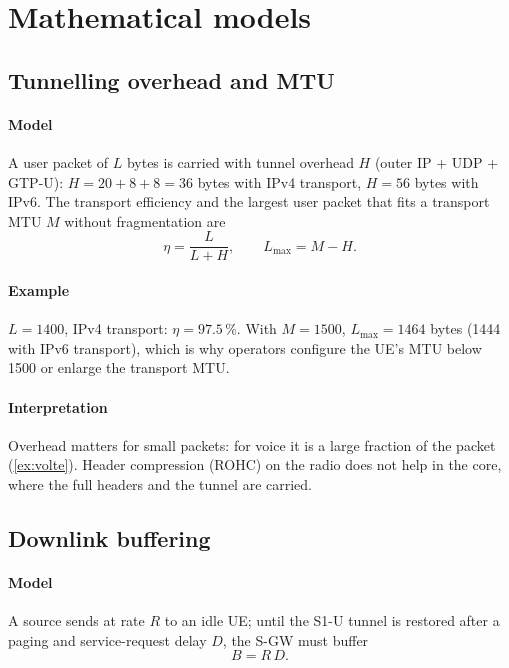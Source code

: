 \documentclass[11pt,a4paper]{article}
\begin{document}
\section{Mathematical models}

\subsection{Tunnelling overhead and MTU}\label{sec:gtp}
\paragraph{Model} A user packet of $L$ bytes is carried with tunnel overhead $H$ (outer IP + UDP + GTP-U):
$H = 20+8+8 = 36$ bytes with IPv4 transport, $H = 56$ bytes with IPv6. The transport efficiency and the
largest user packet that fits a transport MTU $M$ without fragmentation are
\begin{equation}\label{eq:gtpeff}
  \eta = \frac{L}{L+H}, \qquad L_{\max} = M - H .
\end{equation}
\paragraph{Example} $L = 1400$, IPv4 transport: $\eta = 97.5\,\%$. With $M = 1500$, $L_{\max} = 1464$ bytes
(1444 with IPv6 transport), which is why operators configure the UE's MTU below 1500 or enlarge the
transport MTU.
\paragraph{Interpretation} Overhead matters for small packets: for voice it is a large fraction of the
packet (\cref{ex:volte}). Header compression (ROHC) on the radio does not help in the core, where the full
headers and the tunnel are carried.

\subsection{Downlink buffering}\label{sec:buffer}
\paragraph{Model} A source sends at rate $R$ to an idle UE; until the S1-U tunnel is restored after a
paging and service-request delay $D$, the S-GW must buffer
\begin{equation}\label{eq:buffer}
  B = R\,D .
\end{equation}
\end{document}
